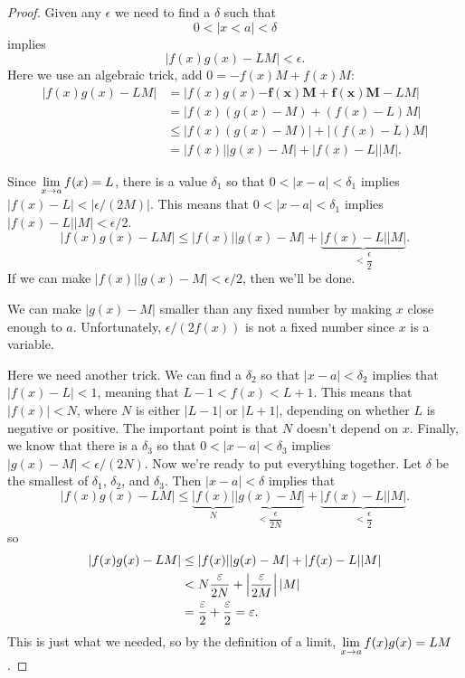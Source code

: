 \begin{proof} 
Given any $\epsilon$ we need to find a $\delta$ such that
\[
0<|x< a|< \delta
\]
implies 
\[
|f(x)g(x)-LM|< \epsilon.  
\]
Here we use an algebraic trick, add $0 = -f(x)M+f(x)M$:
\begin{align*}
|f(x)g(x)-LM| &= |f(x)g(x)\boldsymbol{-f(x)M+f(x)M}-LM| \\
&=|f(x)(g(x)-M)+(f(x)-L)M| \\
&\le |f(x)(g(x)-M)|+|(f(x)-L)M| \\
&=|f(x)||g(x)-M|+|f(x)-L||M|.
\end{align*}


Since $\ds \lim_{x\to a}f(x) =L$, there is a value $\delta_1$ so that
$0<|x-a|<\delta_1$ implies $|f(x)-L|<|\epsilon/(2M)|$. This means that
$0<|x-a|<\delta_1$ implies $|f(x)-L||M|< \epsilon/2$. 
\[
|f(x)g(x)-LM|\le|f(x)||g(x)-M|+\underbrace{|f(x)-L||M|}_{<\dfrac{\epsilon}{2}}.
\]
If we can make $|f(x)||g(x)-M|<\epsilon/2$, then we'll be done.

We can make $|g(x)-M|$ smaller than any fixed number by making $x$
close enough to $a$. Unfortunately, $\epsilon/(2f(x))$ is not a fixed
number since $x$ is a variable. 

Here we need another trick. We can find a $\delta_2$ so that
$|x-a|<\delta_2$ implies that $|f(x)-L|<1$, meaning that $L-1 < f(x) <
L+1$. This means that $|f(x)|<N$, where $N$ is either $|L-1|$ or
$|L+1|$, depending on whether $L$ is negative or positive. The
important point is that $N$ doesn't depend on $x$. Finally, we know
that there is a $\delta_3$ so that $0<|x-a|<\delta_3$ implies
$|g(x)-M|<\epsilon/(2N)$. Now we're ready to put everything
together. Let $\delta$ be the smallest of $\delta_1$, $\delta_2$, and
$\delta_3$. Then $|x-a|<\delta$ implies that
\[
|f(x)g(x)-LM|\le\underbrace{|f(x)|}_N\underbrace{|g(x)-M|}_{<\dfrac{\epsilon}{2N}}+\underbrace{|f(x)-L||M|}_{<\dfrac{\epsilon}{2}}.
\]
so
\begin{align*}
|f(x)g(x)-LM|&\le|f(x)||g(x)-M|+|f(x)-L||M| \\
&<N{\epsilon\over 2N}+\left|{\epsilon\over 2M}\right||M| \\
&={\epsilon\over 2}+{\epsilon\over 2}=\epsilon.
\end{align*}
This is just what we needed, so by the definition of a limit,
$\ds \lim_{x\to a}f(x)g(x)=LM$.
\end{proof}



